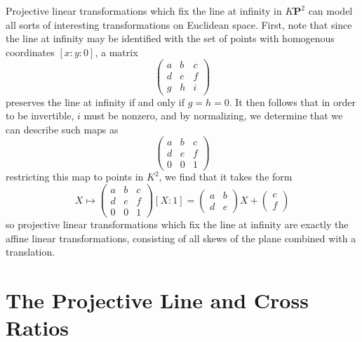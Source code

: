 Projective linear transformations which fix the line at infinity in $K\mathbf{P}^2$ can model all sorts of interesting transformations on Euclidean space. First, note that since the line at infinity may be identified with the set of points with homogenous coordinates $[x:y:0]$, a matrix
%
\[ \begin{pmatrix} a & b & c \\ d & e & f \\ g & h & i \end{pmatrix} \]
%
preserves the line at infinity if and only if $g = h = 0$. It then follows that in order to be invertible, $i$ must be nonzero, and by normalizing, we determine that we can describe such maps as
%
\[ \begin{pmatrix} a & b & c \\ d & e & f \\ 0 & 0 & 1 \end{pmatrix} \]
%
restricting this map to points in $K^2$, we find that it takes the form
%
\[ X \mapsto  \begin{pmatrix} a & b & c \\ d & e & f \\ 0 & 0 & 1 \end{pmatrix} [X:1] = \begin{pmatrix} a & b \\ d & e \end{pmatrix} X + \begin{pmatrix} c \\ f \end{pmatrix} \]
%
so projective linear transformations which fix the line at infinity are exactly the affine linear transformations, consisting of all skews of the plane combined with a translation.

\section{The Projective Line and Cross Ratios}

